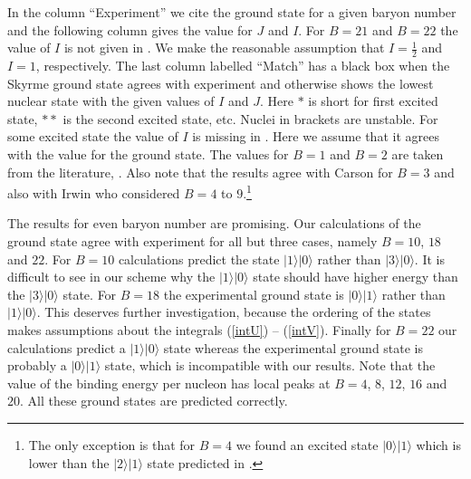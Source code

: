 \documentclass[a4paper,12pt]{article}
\begin{document}
In the column ``Experiment'' we cite the ground state 
for a given baryon number and the following column gives the value for $J$ and 
$I$. For $B=21$ and $B=22$ the value of $I$ is not given in 
\cite{tableofisotopes:1996}. We make the reasonable assumption that 
$I=\frac{1}{2}$ and $I=1$, respectively.
%
The last column labelled ``Match'' has a black box when the Skyrme ground
state agrees with experiment and otherwise shows the lowest nuclear 
state with the given values of $I$ and $J$. Here $*$ is short for first 
excited state, $**$ is the second excited state, etc. Nuclei in brackets 
are unstable. For some excited state the value of $I$ is missing in 
\cite{tableofisotopes:1996}.
Here we assume that it agrees with the value for the ground state.
The values for $B=1$ and $B=2$ are taken from the literature, 
\cite{Adkins:1983ya, Braaten:1988cc}. Also note that the results agree 
with Carson \cite{Carson:1991yv} for $B=3$ and also 
with Irwin \cite{Irwin:1998bs} who considered $B=4$ to $9$.\footnote{The
only exception is that for $B=4$ we found an excited state 
$| 0 \rangle | 1 \rangle$ which is lower than the $| 2 \rangle | 1 
\rangle$ state predicted in \cite{Irwin:1998bs}.}

The results for even baryon number are promising. Our calculations of the 
ground state agree with experiment for all but three cases, namely $B = 
10$, $18$ and $22$. 
%
For $B=10$ calculations predict the state $| 1 \rangle | 0 \rangle$ 
rather 
than $| 3 \rangle | 0 \rangle$. It is difficult to see in our scheme 
why the  $| 1 \rangle  | 0 \rangle$ state should have higher energy 
than the $| 3 \rangle | 0 \rangle$ state.
%
For $B=18$ the experimental ground state is $| 0 \rangle | 1 \rangle$ 
rather than $| 1 \rangle | 0 \rangle$. 
This deserves further investigation, because the 
ordering of the states makes assumptions about the integrals 
(\ref{intU}) -- (\ref{intV}).
%
Finally for $B=22$ our calculations predict a $| 1 \rangle | 0 \rangle$ 
state whereas the experimental ground state is probably a $| 0 \rangle | 1 
\rangle$ state, which is incompatible with our results.
Note that the value of the binding energy per nucleon  has local peaks at
$B=4$, $8$, $12$, $16$ and $20$. All these ground states are predicted
correctly.
\end{document}
